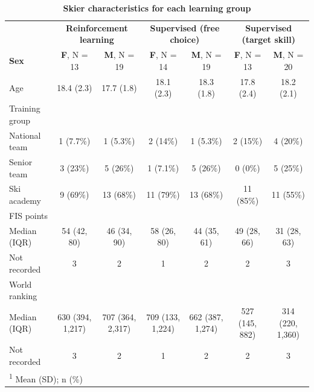 \documentclass[pdflatex,sn-nature]{sn-jnl}%
\theoremstyle{thmstyleone}%
\theoremstyle{thmstyletwo}%
\theoremstyle{thmstylethree}%
\begin{document}
\begin{table}
\label{descriptive_skier}
\caption{\textbf{Skier characteristics for each learning group}}
\centering
\begin{tabular}[H]{l|c|c|c|c|c|c}
\hline
\multicolumn{1}{c|}{ } & \multicolumn{2}{c|}{\textbf{Reinforcement learning}} & \multicolumn{2}{c|}{\textbf{Supervised (free choice)}} & \multicolumn{2}{c}{\textbf{Supervised (target skill)}} \\
\textbf{Sex} & \textbf{F}, N = 13 & \textbf{M}, N = 19 & \textbf{F}, N = 14 & \textbf{M}, N = 19 & \textbf{F}, N = 13 & \textbf{M}, N = 20\\
\hline
Age & 18.4 (2.3) & 17.7 (1.8) & 18.1 (2.3) & 18.3 (1.8) & 17.8 (2.4) & 18.2 (2.1)\\
\hline
Training group &  &  &  &  &  & \\
\hline
\hspace{1em}National team & 1 (7.7\%) & 1 (5.3\%) & 2 (14\%) & 1 (5.3\%) & 2 (15\%) & 4 (20\%)\\
\hline
\hspace{1em}Senior team & 3 (23\%) & 5 (26\%) & 1 (7.1\%) & 5 (26\%) & 0 (0\%) & 5 (25\%)\\
\hline
\hspace{1em}Ski academy & 9 (69\%) & 13 (68\%) & 11 (79\%) & 13 (68\%) & 11 (85\%) & 11 (55\%)\\
\hline
FIS points &  &  &  &  &  & \\
\hline
\hspace{1em}Median (IQR) & 54 (42, 80) & 46 (34, 90) & 58 (26, 80) & 44 (35, 61) & 49 (28, 66) & 31 (28, 63)\\
\hline
\hspace{1em}Not recorded & 3 & 2 & 1 & 2 & 2 & \vphantom{1} 3\\
\hline
World ranking &  &  &  &  &  & \\
\hline
\hspace{1em}Median (IQR) & 630 (394, 1,217) & 707 (364, 2,317) & 709 (133, 1,224) & 662 (387, 1,274) & 527 (145, 882) & 314 (220, 1,360)\\
\hline
\hspace{1em}Not recorded & 3 & 2 & 1 & 2 & 2 & 3\\
\hline
\multicolumn{7}{l}{\rule{0pt}{1em}\textsuperscript{1} Mean (SD); n (\%)}\\
\end{tabular}
\end{table}
\end{document}
